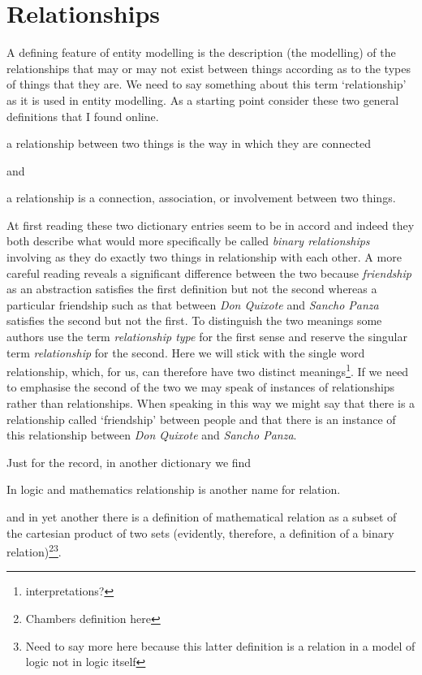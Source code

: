 
\section{Relationships}
\label{Relationships}
\mynote
A defining feature of entity modelling is the description
 (the modelling) of the relationships that may or may not  exist between things according as to the types of things that they are. 
\mynote 
We need to say something about this term `relationship' as it is used in
entity modelling.
As a starting point consider these two general definitions that I found online. 

\begin{erquote}
a relationship between two things is the way in which they are connected
\end{erquote}
and 
\begin{erquote}
a relationship is a connection, association, or involvement between two things.
\end{erquote}

At first reading these two dictionary entries seem to be in accord and indeed 
they both describe what would more specifically be called \textit{binary relationships} involving as they do exactly two things in relationship with each other.
A more careful reading reveals a significant difference between the two because \textit{friendship} as an abstraction satisfies the first definition but not the second whereas a particular friendship such as that between \textit{Don Quixote} and \textit{Sancho Panza} satisfies the second  but not the first. 
To distinguish the two meanings some authors use the term \textit{relationship type} for the first sense and reserve the singular term \textit{relationship}  for the second. Here we will stick with the single word relationship, which, for us, can therefore have two distinct meanings\footnote{interpretations?}. If we need to emphasise the second of the two we may speak of instances of relationships rather than relationships. When speaking in this way we might say that there is a relationship called `friendship' between people and that there is an instance of this relationship between \textit{Don Quixote} and \textit{Sancho Panza}.

\mynote
Just for the record, in another dictionary we find 
\begin{erquote}
In logic and mathematics relationship is another name for relation.
\end{erquote}
and in yet another there is a definition of mathematical relation as a subset of the cartesian product of two sets 
(evidently, therefore, a definition of a binary relation)\footnote{Chambers definition here}\footnote{Need to say more here because this latter definition is a relation in a model of logic not in logic itself}. 


